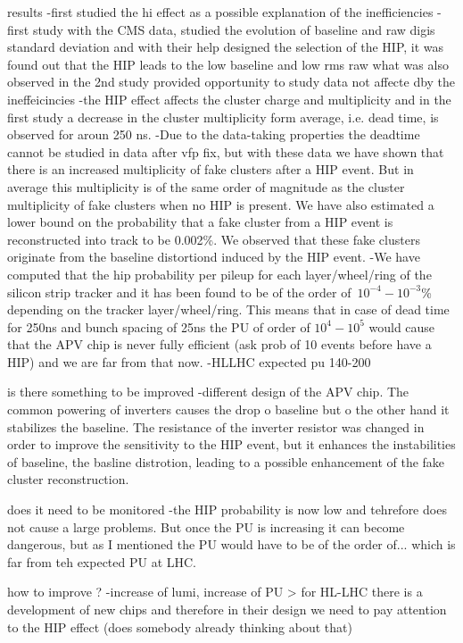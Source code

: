 results
	-first studied the hi effect as a possible explanation of the inefficiencies
	-first study with the CMS data, studied the evolution of baseline and raw digis standard deviation and with their help designed the selection of the HIP, it was found out that the HIP leads to the low baseline and low rms raw what was also observed in the 2nd study provided opportunity to study data not affecte dby the ineffeicincies
	-the HIP effect affects the cluster charge and multiplicity and in the first study a decrease in the cluster multiplicity form average, i.e. dead time, is observed for aroun 250 ns.
	-Due to the data-taking properties the deadtime cannot be studied in data after vfp fix, but with these data we have shown that there is an increased multiplicity of fake clusters after a HIP event. But in average this multiplicity is of the same order of magnitude as the cluster multiplicity of fake clusters when no HIP is present. We have also estimated a lower bound on the probability that a fake cluster from a HIP event is reconstructed into track to be 0.002\%. We observed that these fake clusters originate from the baseline distortiond induced by the HIP event. 
	-We have computed that the hip probability per pileup for each layer/wheel/ring of the silicon strip tracker and it has been found to be of the order of~$10^{-4}-10^{-3}$\% depending on the tracker layer/wheel/ring. This means that in case of dead time for 250ns and bunch spacing of 25ns the PU of order of $10^4-10^5$  would cause that the APV chip is never fully efficient (ask prob of 10 events before have a HIP) and we are far from that now.
	-HLLHC expected pu 140-200
 
is there something to be improved
	-different design of the APV chip. The common powering of inverters causes the drop o baseline but o the other hand it stabilizes the baseline. The resistance of the inverter resistor was changed in order to improve the sensitivity to the HIP event, but it enhances the instabilities of baseline, the basline distrotion, leading to a possible enhancement of the fake cluster reconstruction.

does it need to be monitored
	-the HIP probability is now low and tehrefore does not cause a large problems. But once the PU is increasing it can become dangerous, but as I mentioned the PU would have to be of the order of... which is far from teh expected PU at LHC.
 
how to improve ?
	-increase of lumi, increase of PU > for HL-LHC there is a development of new chips and therefore in their design we need to pay attention to the HIP effect (does somebody already thinking about that)

